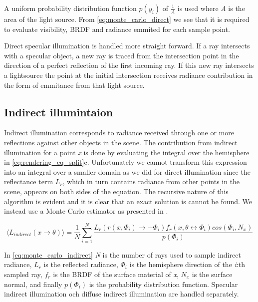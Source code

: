 \documentclass[]{report}   %
\begin{document}
A uniform probability distribution function $p(y_i)$ of $\frac{1}{A}$ is used where \emph{A} is the area of the light source.
From \autoref{eq:monte_carlo_direct} we see that it is required to evaluate visibility, BRDF and radiance emmited for each sample point.

Direct specular illumination is handled more straight forward.
If a ray intersects with a specular object, a new ray is traced from the intersection point in the direction of a perfect reflection of the first incoming ray.
If this new ray intersects a lightsource the point at the initial intersection receives radiance contribution in the form of emmitance from that light source.

\subsection{Indirect illumintaion}
Indirect illumination corresponds to radiance received through one or more reflections against other objects in the scene.
The contribution from indirect illumination for a point \emph{x} is done by evaluating the integral over the hemisphere in \autoref{eq:rendering_eq_split}c. Unfortunately we cannot transform this expression into an integral over a smaller domain as we did for direct illumination since the reflectance term $L_r$, which in turn contains radiance from other points in the scene, appears on both sides of the equation.
The recursive nature of this algorithm is evident and it is clear that an exact solution is cannot be found.
We instead use a Monte Carlo estimator as presented in \cite{dutre}.

\begin{equation}
\label{eq:monte_carlo_indirect}
\langle L_{indirect}(x \rightarrow \theta) \rangle = \frac{1}{N} \sum^{N}_{i=1} \frac{L_r(r(x,\Phi_i) \rightarrow -\Phi_i) f_r(x, \theta \leftrightarrow \Phi_i)cos(\Phi_i, N_x)}{p(\Phi_i)}
\end{equation}

In \autoref{eq:monte_carlo_indirect} \emph{N} is the number of rays used to sample indirect radiance, $L_r$ is the reflected radiance, $\Phi_i$ is the hemisphere direction of the \emph{i}:th sampled ray, $f_r$ is the BRDF of the surface material of \emph{x}, $N_x$ is the surface normal, and finally $p(\Phi_i)$ is the probability distribution function.
Specular indirect illumination och diffuse indirect illumination are handled separately.
\end{document}
